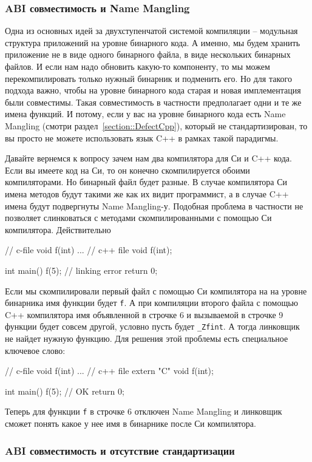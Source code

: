 \subsubsection{ABI совместимость и Name Mangling}

Одна из основных идей за двухступенчатой системой компиляции -- модульная структура приложений на уровне бинарного кода.
А именно, мы будем хранить приложение не в виде одного бинарного файла, в виде нескольких бинарных файлов.
И если нам надо обновить какую-то компоненту, то мы можем перекомпилировать только нужный бинарник и подменить его.
Но для такого подхода важно, чтобы на уровне бинарного кода старая и новая имплементация были совместимы.
Такая совместимость в частности предполагает одни и те же имена функций.
И потому, если у вас на уровне бинарного кода есть Name Mangling (смотри раздел~\ref{section::DefectCpp}), который не стандартизирован, то вы просто не можете использовать язык C++ в рамках такой парадигмы.

Давайте вернемся к вопросу зачем нам два компилятора для Си и C++ кода.
Если вы имеете код на Си, то он конечно скомпилируется обоими компиляторами.
Но бинарный файл будет разные.
В случае компилятора Си имена методов будут такими же как их видит программист, а в случае C++ имена будут подвергнуты Name Mangling-у.
Подобная проблема в частности не позволяет слинковаться с методами скомпилированными с помощью Си компилятора.
Действительно
\begin{cppcode}
// c-file 
void f(int) {
...
}
// c++ file
void f(int);

int main() {
  f(5); // linking error
  return 0;
}
\end{cppcode}
Если мы скомпилировали первый файл с помощью Си компилятора на на уровне бинарника имя функции будет \verb"f".
А при компиляции второго файла с помощью C++ компилятора имя объявленной в строчке 6 и вызываемой в строчке 9 функции будет совсем другой, условно пусть будет \verb"_Zfint".
А тогда линковщик не найдет нужную функцию.
Для решения этой проблемы есть специальное ключевое слово: %
\begin{cppcode}
// c-file 
void f(int) {
...
}
// c++ file
extern "C" void f(int);

int main() {
  f(5); // OK
  return 0;
}
\end{cppcode}
Теперь для функции \verb"f" в строчке 6 отключен Name Mangling и линковщик сможет понять какое у нее имя в бинарнике после Си компилятора.

\subsubsection{ABI совместимость и отсутствие стандартизации}

